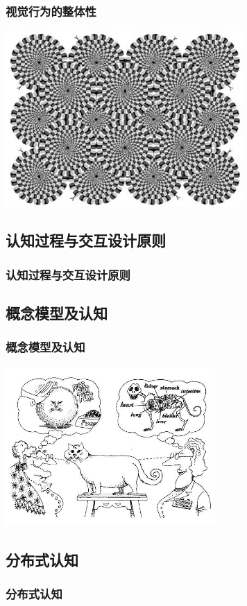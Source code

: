 \documentclass{beamer}
\begin{document}
\begin{frame}
	\frametitle{视觉行为的整体性}
	\includegraphics[width=9cm]{images/gestalt1.jpg}
\end{frame}

\subsection{认知过程与交互设计原则}
\begin{frame}
	\frametitle{认知过程与交互设计原则}

\end{frame}

\subsection{概念模型及认知}
\begin{frame}
	\frametitle{概念模型及认知}
	\begin{center}
		\includegraphics[width=8cm]{images/viewpoint.jpg}
	\end{center}
\end{frame}

\subsection{分布式认知}
\begin{frame}
	\frametitle{分布式认知}

\end{frame}
\end{document}

